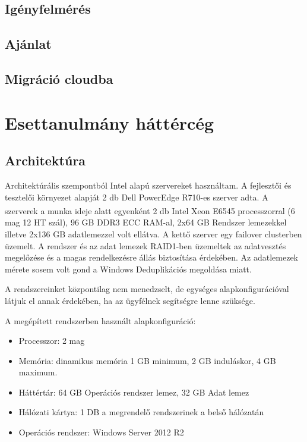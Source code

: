 \documentclass[12pt,oneside,justify]{book}
\begin{document}
\section{Igényfelmérés}


\section{Ajánlat}


\section{Migráció cloudba}


\chapter{Esettanulmány háttércég}

\section{Architektúra}

Architektúrális szempontból Intel alapú szervereket használtam. A fejlesztői és tesztelői környezet alapját 2 db Dell PowerEdge R710-es szerver adta. A szerverek a munka ideje alatt egyenként 2 db Intel{\textsuperscript{\textregistered}} Xeon{\textsuperscript{\textregistered}} E6545 processzorral (6 mag 12 HT szál), 96 GB DDR3 ECC RAM-al, 2x64 GB Rendszer lemezekkel illetve 2x136 GB adatlemezzel volt ellátva. A kettő szerver egy failover clusterben üzemelt. A rendszer és az adat lemezek RAID1-ben üzemeltek az adatvesztés megelőzése és a magas rendelkezésre állás biztosítása érdekében. Az adatlemezek mérete sosem volt gond a Windows Deduplikációs megoldása miatt.


A rendszereinket központilag nem menedzselt, de egységes alapkonfigurációval látjuk el annak érdekében, ha az ügyfélnek segítségre lenne szüksége. 


A megépített rendszerben használt alapkonfiguráció:
\begin{itemize}
	\item Processzor: 2 mag
	\item Memória: dinamikus memória 1 GB minimum, 2 GB induláskor, 4 GB maximum.
	\item Háttértár: 64 GB Operációs rendszer lemez, 32 GB Adat lemez
	\item Hálózati kártya: 1 DB a megrendelő rendszerinek a belső hálózatán
	\item Operációs rendszer: Windows Server 2012 R2
\end{itemize}
\end{document}

